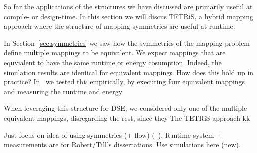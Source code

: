 So far the applications of the structures we have discussed are primarily useful at compile- or design-time.
In this section we will discus \acs{TETRiS}, a hybrid mapping approach where the structure of mapping symmetries are useful at runtime.

In Section~\ref{sec:symmetries} we saw how the symmetries of the mapping problem define multiple mappings to be equivalent.
We expect mappings that are equvialent to have the same runtime or energy cosumption. Indeed, the simulation results are identical for equivalent mappings.
How does this hold up in practice? In~\cite{goens_scopes17} we tested this empirically, by executing four equivalent mappings and measuring the runtime and energy 

When leveraging this structure for \ac{DSE}, we considered only one of the multiple equivalent mappings, disregarding the rest, since they 
The \acf{TETRiS} approach kk

Just focus on idea of using symmetries (+ flow) (~\cite{goens_scopes17}). Runtime system + measurements are for Robert/Till's dissertations.
Use simulations here (new).